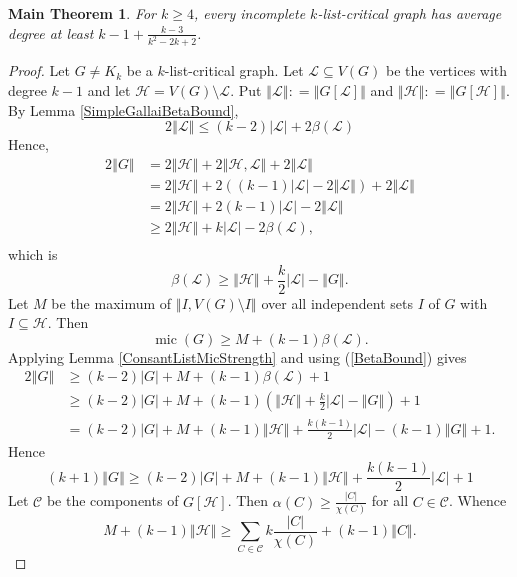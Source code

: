 \documentclass[12pt]{article}
\theoremstyle{plain}
\newtheorem*{MainTheorem}{Main Theorem}
\theoremstyle{definition}
\theoremstyle{remark}
\newcommand{\fancy}[1]{\mathcal{#1}}
\newcommand{\C}[1]{\fancy{C}_{#1}}
\renewcommand{\L}{\fancy{L}}
\newcommand{\HH}{\fancy{H}}
\newcommand{\card}[1]{\left|#1\right|}
\newcommand{\size}[1]{\left\Vert#1\right\Vert}
\newcommand{\parens}[1]{\left( #1 \right)}
\newcommand{\DefinedAs}{\mathrel{\mathop:}=}
\newcommand{\mic}{\operatorname{mic}}
\def\C{\fancy{C}}
\begin{document}
\begin{MainTheorem}
	For $k \ge 4$, every incomplete $k$-list-critical graph has average degree at least $k-1 + \frac{k-3}{k^2-2k+2}$.
\end{MainTheorem}
\begin{proof}
Let $G \ne K_k$ be a $k$-list-critical graph.  Let $\L \subseteq V(G)$ be the vertices with degree $k-1$ and let $\HH = V(G) \setminus \L$.  Put $\size{\L} \DefinedAs \size{G[\L]}$ and $\size{\HH} \DefinedAs \size{G[\HH]}$.  
By Lemma \ref{SimpleGallaiBetaBound},
	\begin{equation*}
	2\size{\L} \le (k-2)|\L| + 2\beta(\L)
	\end{equation*}
	Hence,
	\begin{align*}
	2\size{G} &= 2\size{\HH} + 2\size{\HH, \L} + 2\size{\L}\\
	&= 2\size{\HH} + 2((k-1)\card{\L} - 2\size{\L}) + 2\size{\L}\\
	&= 2\size{\HH} + 2(k-1)\card{\L} - 2\size{\L}\\
	&\ge 2\size{\HH} + k\card{\L} - 2\beta(\L),\\
	\end{align*}
	which is
	\begin{equation}
	\beta(\L) \ge \size{\HH} + \frac{k}{2}\card{\L} - \size{G}.
	\label{BetaBound}
	\end{equation}
	Let $M$ be the maximum of $\size{I, V(G) \setminus I}$ over all independent sets $I$ of $G$ with $I \subseteq \HH$. Then
	\begin{equation*}
		\mic(G) \ge M + (k-1)\beta(\L).
	\end{equation*}
	Applying Lemma \ref{ConsantListMicStrength} and using (\ref{BetaBound}) gives
	\begin{align*}
	2\size{G} &\ge (k-2)\card{G} + M + (k-1)\beta(\L) + 1\\
	&\ge (k-2)\card{G} + M + (k-1)\parens{\size{\HH} + \frac{k}{2}\card{\L} - \size{G}} + 1\\
	&= (k-2)\card{G} + M + (k-1)\size{\HH} + \frac{k(k-1)}{2}\card{\L} - (k-1)\size{G} + 1.
	\end{align*}		
	Hence
	\begin{equation}
	(k+1)\size{G} \ge (k-2)\card{G} + M + (k-1)\size{\HH} + \frac{k(k-1)}{2}\card{\L} + 1
	\label{KPOBound}
	\end{equation}
	Let $\C$ be the components of $G[\HH]$.  Then $\alpha(C) \ge \frac{\card{C}}{\chi(C)}$ for all $C \in \C$.  Whence
	\begin{equation}
	  M + (k-1)\size{\HH} \ge \sum_{C \in \C} k\frac{\card{C}}{\chi(C)} + (k-1)\size{C}.
	  \label{Mbound}
	\end{equation}
	

\end{proof}
\end{document}

